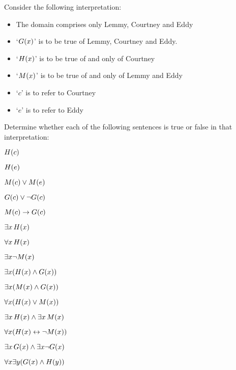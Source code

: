 \problempart
\label{pr.TorF2}
Consider the following interpretation:	
	\begin{itemize}
		\item The domain comprises only Lemmy, Courtney and Eddy
		\item `$\mathord{G}(x)$' is to be true of Lemmy, Courtney and Eddy.
		\item `$\mathord{H}(x)$' is to be true of and only of Courtney
		\item `$\mathord{M}(x)$' is to be true of and only of Lemmy and Eddy
		\item `$c$' is to refer to Courtney
		\item `$e$' is to refer to Eddy
	\end{itemize}
Determine whether each of the following sentences is true or false in that interpretation:
\begin{compactlist}
\item $\mathord{H}(c)$ \hfill {}
\item $\mathord{H}(e)$\hfill {}
\item $\mathord{M}(c) \vee \mathord{M}(e)$ \hfill {}
\item $\mathord{G}(c) \vee \neg \mathord{G}(c)$ \hfill {}
\item $\mathord{M}(c) \rightarrow \mathord{G}(c)$ \hfill {}
\item $\exists x\,\mathord{H}(x)$ \hfill {}
\item $\forall x\,\mathord{H}(x)$ \hfill {}
\item $\exists x \neg \mathord{M}(x)$ \hfill {}
\item $\exists x(\mathord{H}(x) \wedge \mathord{G}(x))$ \hfill {}
\item $\exists x(\mathord{M}(x) \wedge \mathord{G}(x))$ \hfill {}
\item $\forall x(\mathord{H}(x) \vee \mathord{M}(x))$ \hfill {}
\item $\exists x\,\mathord{H}(x) \wedge \exists x\,\mathord{M}(x)$ \hfill {}
\item $\forall x(\mathord{H}(x) \leftrightarrow \neg \mathord{M}(x))$ \hfill {}
\item $\exists x\,\mathord{G}(x) \wedge \exists x \neg \mathord{G}(x)$ \hfill {}
\item $\forall x\exists y(\mathord{G}(x) \wedge \mathord{H}(y))$ \hfill {}
\end{compactlist}

